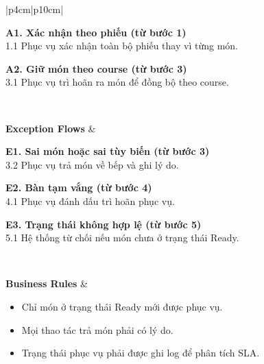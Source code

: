 \begin{longtable}{|p{4cm}|p{10cm}|}
\begin{minipage}[t]{\linewidth}
\textbf{A1. Xác nhận theo phiếu (từ bước 1)} \\
1.1 Phục vụ xác nhận toàn bộ phiếu thay vì từng món.

\vspace{0.5em}
\textbf{A2. Giữ món theo course (từ bước 3)} \\
3.1 Phục vụ trì hoãn ra món để đồng bộ theo course.

\end{minipage} \\ \hline

\textbf{Exception Flows} &
\begin{minipage}[t]{\linewidth}

\textbf{E1. Sai món hoặc sai tùy biến (từ bước 3)} \\
3.2 Phục vụ trả món về bếp và ghi lý do.

\vspace{0.5em}
\textbf{E2. Bàn tạm vắng (từ bước 4)} \\
4.1 Phục vụ đánh dấu trì hoãn phục vụ.

\vspace{0.5em}
\textbf{E3. Trạng thái không hợp lệ (từ bước 5)} \\
5.1 Hệ thống từ chối nếu món chưa ở trạng thái \textsf{Ready}.

\end{minipage} \\ \hline

\textbf{Business Rules} &
\begin{itemize}[leftmargin=*, noitemsep]
  \item Chỉ món ở trạng thái \textsf{Ready} mới được phục vụ.
  \item Mọi thao tác trả món phải có lý do.
  \item Trạng thái phục vụ phải được ghi log để phân tích SLA.
\end{itemize} \\ \hline

\end{longtable}



    \renewcommand{\arraystretch}{1.3}

